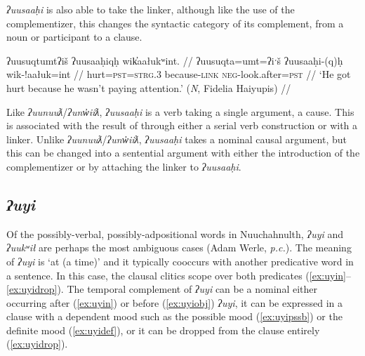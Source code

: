 \textit{ʔuusaaḥi} is also able to take the linker, although like the use of the complementizer, this changes the syntactic category of its complement, from a noun or participant to a clause.

\ex \label{ex:uusahiqh}
\begingl
\glpreamble ʔuusuqtumtʔiš ʔuusaaḥiqḥ wik̓aałukʷint. //
\gla ʔuusuqta=umt=ʔiˑš ʔuusaaḥi-(q)ḥ wik-!aałuk=int //
\glb hurt=\textsc{pst}=\textsc{strg.3} because-\textsc{link} \textsc{neg}-look.after=\textsc{pst}  //
\glft `He got hurt because he wasn't paying attention.' (\textit{N}, Fidelia Haiyupis) //
\endgl
\xe



Like \textit{ʔuunuuƛ}/\textit{ʔunw̓iiƛ}, \textit{ʔuusaaḥi} is a verb taking a single argument, a cause. This is associated with the result of through either a serial verb construction or with a linker. Unlike \textit{ʔuunuuƛ}/\textit{ʔunw̓iiƛ}, \textit{ʔuusaaḥi} takes a nominal causal argument, but this can be changed into a sentential argument with either the introduction of the complementizer or by attaching the linker to \textit{ʔuusaaḥi}.

\subsection{\textit{ʔuyi}} \label{ch:link:uyi}

Of the possibly-verbal, possibly-adpositional words in Nuuchahnulth, \textit{ʔuyi} and \textit{ʔuukʷił} are perhaps the most ambiguous cases (Adam Werle, \textit{p.c.}). The meaning of \textit{ʔuyi} is `at (a time)' and it typically cooccurs with another predicative word in a sentence. In this case, the clausal clitics scope over both predicates (\ref{ex:uyin}--\ref{ex:uyidrop}). The temporal complement of \textit{ʔuyi} can be a nominal either occurring after (\ref{ex:uyin}) or before (\ref{ex:uyiobj}) \textit{ʔuyi}, it can be expressed in a clause with a dependent mood such as the possible mood (\ref{ex:uyipssb}) or the definite mood (\ref{ex:uyidef}), or it can be dropped from the clause entirely (\ref{ex:uyidrop}).

